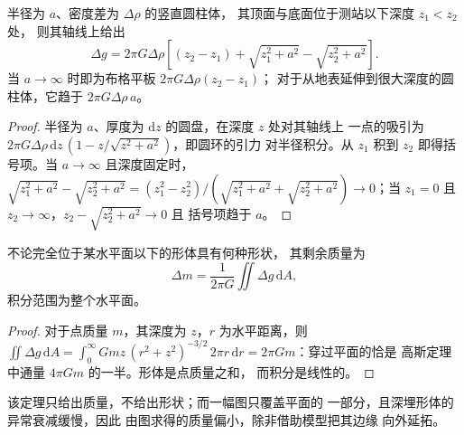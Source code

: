 \begin{proposition}[轴线上的竖直圆柱体]\label{prop:b3:field-lab-methods-3:vcyl}
半径为 $a$、密度差为 $\Delta\rho$ 的竖直圆柱体，
其顶面与底面位于测站以下深度 $z_1 < z_2$ 处，
则其轴线上给出
\[
\Delta g = 2\pi G\Delta\rho\left[(z_2 - z_1) + \sqrt{z_1^2 + a^2}
           - \sqrt{z_2^2 + a^2}\right] .
\]
当 $a \to \infty$ 时即为布格平板 $2\pi G\Delta\rho(z_2 - z_1)$；
对于从地表延伸到很大深度的圆柱体，它趋于
$2\pi G\Delta\rho\,a$。
\end{proposition}

\begin{proof}
半径为 $a$、厚度为 $\mathrm{d}z$ 的圆盘，在深度 $z$ 处对其轴线上
一点的吸引为 $2\pi G\Delta\rho\,\mathrm{d}z\,(1 -
z/\sqrt{z^2 + a^2})$，即圆环的引力
对半径积分。从 $z_1$ 积到 $z_2$ 即得括号项。当 $a \to
\infty$ 且深度固定时，$\sqrt{z_1^2 + a^2} - \sqrt{z_2^2 + a^2} =
(z_1^2 - z_2^2)/(\sqrt{z_1^2 + a^2} + \sqrt{z_2^2 + a^2}) \to 0$；当
$z_1 = 0$ 且 $z_2 \to \infty$，$z_2 - \sqrt{z_2^2 + a^2} \to 0$ 且
括号项趋于 $a$。
\end{proof}

\begin{proposition}[由重力图求剩余质量]\label{prop:b3:field-lab-methods-3:gauss}
不论完全位于某水平面以下的形体具有何种形状，
其剩余质量为
\[
\Delta m = \frac{1}{2\pi G}\iint \Delta g\,\mathrm{d}A ,
\]
积分范围为整个水平面。
\end{proposition}

\begin{proof}
对于点质量 $m$，其深度为 $z$，$r$ 为水平距离，则
$\iint \Delta g\,\mathrm{d}A = \int_0^\infty
Gmz\,(r^2 + z^2)^{-3/2}\,2\pi r\,\mathrm{d}r = 2\pi Gm$：穿过平面的恰是
高斯定理中通量 $4\pi Gm$ 的一半。形体是点质量之和，
而积分是线性的。
\end{proof}

该定理只给出质量，不给出形状；而一幅图只覆盖平面的
一部分，且深埋形体的异常衰减缓慢，因此
由图求得的质量偏小，除非借助模型把其边缘
向外延拓。

